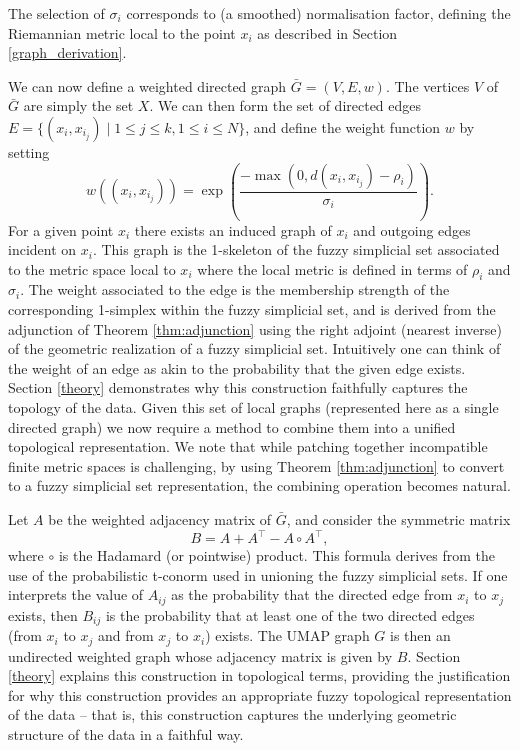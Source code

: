 \documentclass[12pt]{article}
\begin{document}
The selection of $\sigma_i$ corresponds to (a smoothed) normalisation factor, defining the Riemannian metric local to the point $x_i$ as described in Section {\ref{graph_derivation}}.

We can now define a weighted directed graph $\bar{G} = (V, E, w)$. The vertices $V$ of $\bar{G}$ are simply the set $X$. We can then form the set of directed edges $E = \{(x_i, x_{i_j}) \mid 1\leq j\leq k, 1\leq i\leq N\}$, and define the weight function $w$ by setting
\[
w((x_i, x_{i_j})) = \exp\left(\frac{-\max(0, d(x_i, x_{i_j}) - \rho_i)}{\sigma_i}\right).
\]
For a given point $x_i$ there exists an induced graph of $x_i$ and outgoing edges incident on $x_i$. This graph is the 1-skeleton of the fuzzy simplicial set associated to the metric space local to $x_i$ where the local metric is defined in terms of $\rho_i$ and $\sigma_i$. The weight associated to the edge is the membership strength of the corresponding 1-simplex within the fuzzy simplicial set, and is derived from the adjunction of Theorem {\ref{thm:adjunction}} using the right adjoint (nearest inverse) of the geometric realization of a fuzzy simplicial set. Intuitively one can think of the weight of an edge as akin to the probability that the given edge exists. Section \ref{theory} demonstrates why this construction faithfully  captures the topology of the data. Given this set of local graphs (represented here as a single directed graph) we now require a method to combine them into a unified topological representation. We note that while patching together incompatible finite metric spaces is challenging, by using Theorem {\ref{thm:adjunction}} to convert to a fuzzy simplicial set representation, the combining operation becomes natural.

Let $A$ be the weighted adjacency matrix of $\bar{G}$, and consider the symmetric matrix
\[
B = A + A^\top - A \circ A^\top,
\]
where $\circ$ is the Hadamard (or pointwise) product. This formula derives from the use of the probabilistic t-conorm used in unioning the fuzzy simplicial sets. If one interprets the value of $A_{ij}$ as the probability that the directed edge from $x_i$ to $x_j$ exists, then $B_{ij}$ is the probability that at least one of the two directed edges (from $x_i$ to $x_j$ and from $x_j$ to $x_i$) exists. The UMAP graph $G$ is then an undirected weighted graph whose adjacency matrix is given by $B$. Section \ref{theory} explains this construction in topological terms, providing the justification for why this construction provides an appropriate fuzzy topological representation of the data -- that is, this construction captures the underlying geometric structure of the data in a faithful way.
\end{document}
